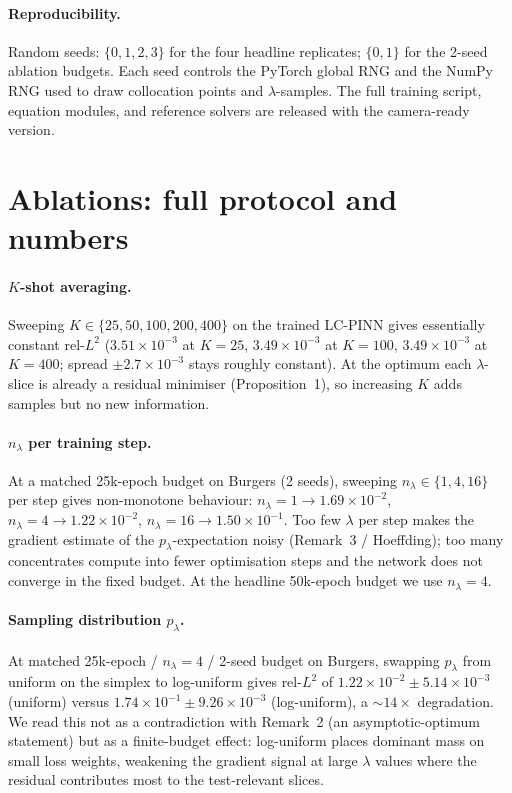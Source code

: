 \documentclass{article}
\theoremstyle{plain}
\theoremstyle{definition}
\theoremstyle{remark}
\begin{document}
\paragraph{Reproducibility.}
Random seeds: $\{0, 1, 2, 3\}$ for the four headline replicates;
$\{0, 1\}$ for the 2-seed ablation budgets. Each seed controls the
PyTorch global RNG and the NumPy RNG used to draw collocation
points and $\lambda$-samples. The full training script, equation
modules, and reference solvers are released with the
camera-ready version.

\section{Ablations: full protocol and numbers}
\label{sec:appendix-ablations}

\paragraph{$K$-shot averaging.}
Sweeping $K \in \{25, 50, 100, 200, 400\}$ on the trained LC-PINN
gives essentially constant rel-$L^2$ ($3.51\!\times\!10^{-3}$ at
$K\!=\!25$, $3.49\!\times\!10^{-3}$ at $K\!=\!100$,
$3.49\!\times\!10^{-3}$ at $K\!=\!400$; spread
$\pm 2.7\!\times\!10^{-3}$ stays roughly constant). At the optimum
each $\lambda$-slice is already a residual minimiser
(Proposition~1), so increasing $K$ adds samples but no new
information.

\paragraph{$n_\lambda$ per training step.}
At a matched 25k-epoch budget on Burgers (2 seeds), sweeping
$n_\lambda \!\in\! \{1, 4, 16\}$ per step gives non-monotone
behaviour: $n_\lambda\!=\!1\!\to\!1.69\!\times\!10^{-2}$,
$n_\lambda\!=\!4\!\to\!1.22\!\times\!10^{-2}$,
$n_\lambda\!=\!16\!\to\!1.50\!\times\!10^{-1}$. Too few
$\lambda$ per step makes the gradient estimate of the
$p_\lambda$-expectation noisy (Remark~3 / Hoeffding); too many
concentrates compute into fewer optimisation steps and the network
does not converge in the fixed budget. At the headline 50k-epoch
budget we use $n_\lambda\!=\!4$.

\paragraph{Sampling distribution $p_\lambda$.}
At matched 25k-epoch / $n_\lambda\!=\!4$ / 2-seed budget on
Burgers, swapping $p_\lambda$ from uniform on the simplex to
log-uniform gives rel-$L^2$ of
$1.22\!\times\!10^{-2} \pm 5.14\!\times\!10^{-3}$ (uniform) versus
$1.74\!\times\!10^{-1} \pm 9.26\!\times\!10^{-3}$ (log-uniform), a
$\sim\!14\times$ degradation. We read this not as a contradiction
with Remark~2 (an asymptotic-optimum statement) but as a
finite-budget effect: log-uniform places dominant mass on small
loss weights, weakening the gradient signal at large $\lambda$
values where the residual contributes most to the test-relevant
slices.
\end{document}
